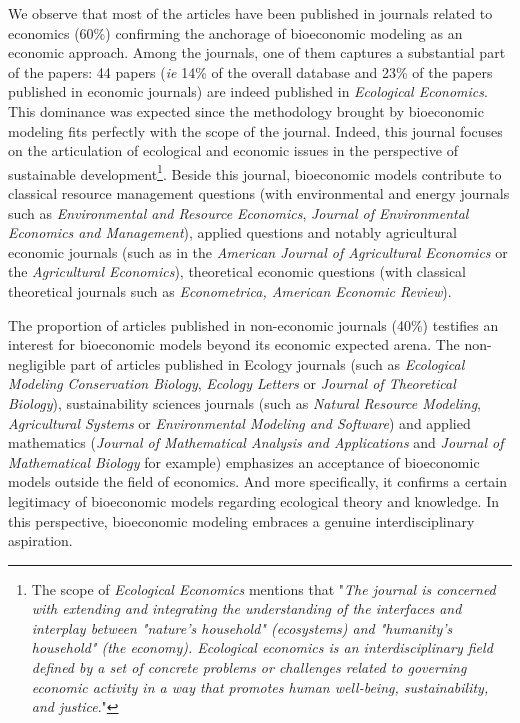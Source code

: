 We observe that most of the articles have been published in journals related to economics (60\%) confirming the anchorage of bioeconomic modeling as an economic approach. Among the journals, one of them captures a substantial part of the papers: 44 papers (\textit{ie} 14\% of the overall database and 23\% of the papers published in economic journals) are indeed published in \textit{Ecological Economics}. This dominance was expected since the methodology brought by bioeconomic modeling fits perfectly with the scope of the journal. Indeed, this journal focuses on the articulation of ecological and economic issues in the perspective of sustainable development\footnote{The scope of \textit{Ecological Economics} mentions that "\textit{The journal is concerned with extending and integrating the understanding of the interfaces and interplay between "nature's household" (ecosystems) and "humanity's household" (the economy). Ecological economics is an interdisciplinary field defined by a set of concrete problems or challenges related to governing economic activity in a way that promotes human well-being, sustainability, and justice}."}. Beside this journal, bioeconomic models contribute to  classical resource management questions (with environmental and energy journals such as\textit{ Environmental and Resource Economics}, \textit{Journal of Environmental Economics and Management}), applied questions and notably agricultural economic journals (such as in the \textit{American Journal of Agricultural Economics} or the \textit{Agricultural Economics}), theoretical economic questions (with classical theoretical journals such as \textit{Econometrica, American Economic Review}).


The  proportion of articles published in non-economic journals (40\%) testifies an interest for bioeconomic models beyond its economic expected arena.  
The non-negligible part of articles published in Ecology journals (such as \textit{Ecological Modeling} \textit{Conservation Biology}, \textit{Ecology Letters} or \textit{Journal of Theoretical Biology}), sustainability sciences journals (such as \textit{Natural Resource Modeling}, \textit{Agricultural Systems} or \textit{Environmental Modeling and Software}) and applied mathematics (\textit{Journal of Mathematical Analysis and Applications} and \textit{Journal of Mathematical Biology} for example) emphasizes an acceptance of bioeconomic models outside the field of economics. And more specifically, it confirms a certain legitimacy of bioeconomic models regarding ecological theory and knowledge. In this perspective, bioeconomic modeling embraces a genuine interdisciplinary aspiration.



